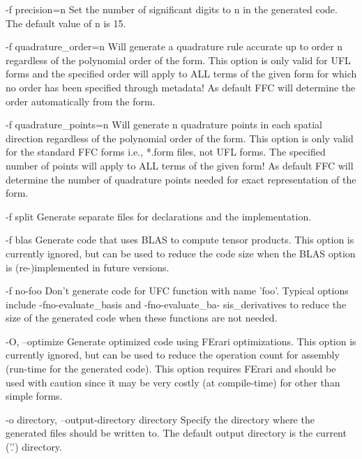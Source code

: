        -f precision=n
              Set the number of significant digits to n in the generated code.
              The default value of n is 15.

       -f quadrature_order=n
              Will generate a quadrature rule accurate up to order n regardless
              of the polynomial order of the form. This option is only valid
              for UFL forms and the specified order will apply to ALL terms of
              the given form for which no order has been specified through
              metadata! As default FFC will determine the order automatically
              from the form.

       -f quadrature_points=n
              Will generate n quadrature points in each spatial direction
              regardless of the polynomial order of the form. This option is
              only valid for the standard FFC forms i.e., *.form files, not
              UFL forms. The specified number of points will apply to ALL terms
              of the given form! As default FFC will determine the number of
              quadrature points needed for exact representation of the form.

       -f split
              Generate separate files for declarations and the implementation.

       -f blas
              Generate  code that uses BLAS to compute tensor products.  This
              option is currently ignored, but can be used to reduce the code
              size when the BLAS option is (re-)implemented in future versions.

       -f no-foo
              Don't generate code for UFC function with name 'foo'. Typical
              options   include   -fno-evaluate_basis   and  -fno-evaluate_ba-
              sis_derivatives to reduce the size  of  the generated code when
              these functions are not needed.

       -O, --optimize
              Generate optimized code using FErari optimizations. This  option
              is  currently  ignored,  but can be used to reduce the operation
              count for assembly  (run-time  for  the  generated  code).  This
              option  requires FErari and should be used with caution since it
              may be very costly  (at  compile-time)  for  other  than  simple
              forms.

       -o directory, --output-directory directory
              Specify the directory where the generated files should be written
              to. The default output directory is the current ('.') directory.


